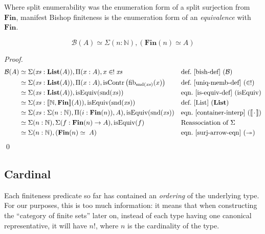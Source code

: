 Where split enumerability was the enumeration form of a split surjection from
\(\mathbf{Fin}\), manifest Bishop finiteness is the enumeration form of an
\emph{equivalence} with \(\mathbf{Fin}\).
\begin{romlemma} \label{bishop-equiv}
  \begin{equation}
    \mathcal{B}(A) \simeq \Sigma {(n : \mathbb{N})} , \left( \mathbf{Fin}(n) \simeq A \right)
  \end{equation}
\end{romlemma}
\begin{proof}
  \begin{align*}
    \mathcal{B}(A)
    & \simeq \Sigma (\mathit{xs} : \textbf{List}(A)) , \Pi {(x : A)} , x \inunique \mathit{xs}
    && \text{def.~\ref{bish-def} } (\mathcal{B})
    \\
    & \simeq \Sigma (\mathit{xs} : \textbf{List}(A)) , \Pi {(x : A)} , \text{isContr} \left(\text{fib}_{\text{snd}(\mathit{xs})}(x)\right)
    && \text{def.~\ref{uniq-memb-def} } (\inunique)
    \\
    & \simeq \Sigma (\mathit{xs} : \textbf{List}(A)) , \text{isEquiv}(\text{snd}(\mathit{xs}))
    && \text{eqn.~\ref{is-equiv-def} (isEquiv)}
    \\
    & \simeq \Sigma (\mathit{xs} : \llbracket \mathbb{N} , \mathbf{Fin} \rrbracket (A)) , \text{isEquiv}(\text{snd}(\mathit{xs}))
    && \text{def.~\ref{List} } (\mathbf{List})
    \\
    & \simeq \Sigma (\mathit{xs} : \Sigma (n : \mathbb{N}) , \Pi (i : \mathbf{Fin}(n)) , A) , \text{isEquiv}(\text{snd}(\mathit{xs}))
    && \text{eqn.~\ref{container-interp} } (\llbracket \wc \rrbracket)
    \\
    & \simeq \Sigma (n : \mathbb{N}) , \Sigma (f : \mathbf{Fin}(n) \rightarrow A) , \text{isEquiv}(f)
    && \text{Reassociation of } \Sigma
    \\
    & \simeq \Sigma (n : \mathbb{N}) , ( \mathbf{Fin}(n) \simeq \; A )
    && \text{eqn.~\ref{surj-arrow-eqn} } (\twoheadrightarrow)
  \end{align*}
  \qed
\end{proof}
\subsection{Cardinal}
Each finiteness predicate so far has contained an \emph{ordering} of the
underlying type.
For our purposes, this is too much information: it means that when constructing
the ``category of finite sets'' later on, instead of each type having one
canonical representative, it will have \(n!\), where \(n\) is the cardinality of
the type.

